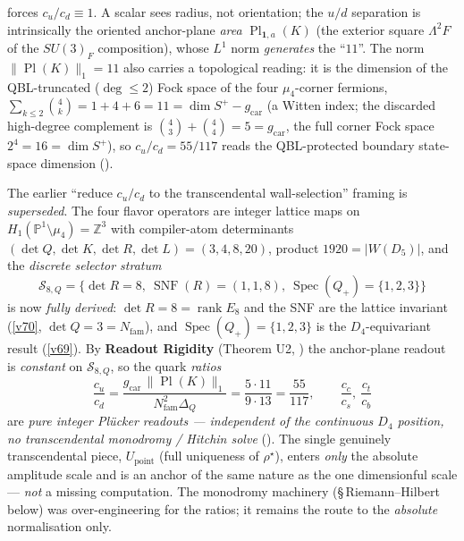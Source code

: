 \documentclass[11pt,a4paper]{article}
\newcommand{\gcar}{g_{\mathrm{car}}}
\newcommand{\Nfam}{N_{\mathrm{fam}}}
\newcommand{\PP}{\mathbb{P}}
\newcommand{\Z}{\mathbb{Z}}
\theoremstyle{definition}
\begin{document}
\begin{keybox}
forces $c_u/c_d\equiv1$. A scalar sees radius, not orientation; the $u/d$ separation is intrinsically the
oriented anchor-plane \emph{area} $\operatorname{Pl}_{\mathbf1,a}(K)$ (the exterior square $\Lambda^2F$ of
the $SU(3)_F$ composition), whose $L^1$ norm \emph{generates} the ``$11$''. 
The norm $\|\operatorname{Pl}(K)\|_1=11$ also carries a topological reading: it is the dimension of the
QBL-truncated ($\deg\le2$) Fock space of the four $\mu_4$-corner fermions,
$\sum_{k\le2}\binom4k=1{+}4{+}6=11=\dim S^+-\gcar$ (a Witten index; the discarded high-degree complement is
$\binom43{+}\binom44=5=\gcar$, the full corner Fock space $2^4=16=\dim S^+$), so $c_u/c_d=55/117$ reads the
QBL-protected boundary state-space dimension ().
\end{keybox}

\begin{keybox}
The earlier ``reduce $c_u/c_d$ to the transcendental wall-selection'' framing is \emph{superseded}. The four
flavor operators are integer lattice maps on $H_1(\PP^1\!\setminus\!\mu_4)=\Z^3$ with compiler-atom
determinants $(\det Q,\det K,\det R,\det L)=(3,4,8,20)$, product $1920=|W(D_5)|$, and the \emph{discrete
selector stratum}
\[
  \mathcal S_{8,Q}=\{\det R=8,\ \operatorname{SNF}(R)=(1,1,8),\ \operatorname{Spec}(Q_+)=\{1,2,3\}\}
\]
is now \emph{fully derived}: $\det R=8=\operatorname{rank}E_8$ and the SNF are the lattice invariant (\vref{v70},
$\det Q=3=\Nfam$), and $\operatorname{Spec}(Q_+)=\{1,2,3\}$ is the $D_4$-equivariant result (\vref{v69}). By
\textbf{Readout Rigidity} (Theorem U2, ) the anchor-plane readout is
\emph{constant} on $\mathcal S_{8,Q}$, so the quark \emph{ratios}
\[
  \frac{c_u}{c_d}=\frac{\gcar\,\|\operatorname{Pl}(K)\|_1}{\Nfam^2\Delta_Q}=\frac{5\cdot11}{9\cdot13}=\frac{55}{117},
  \qquad \frac{c_c}{c_s},\ \frac{c_t}{c_b}
\]
are \emph{pure integer Pl\"ucker readouts --- independent of the continuous $D_4$ position, no transcendental
monodromy / Hitchin solve} (). The single genuinely transcendental piece,
$U_{\mathrm{point}}$ (full uniqueness of $\rho^\star$), enters \emph{only} the absolute amplitude scale and is
an anchor of the same nature as the one dimensionful scale --- \emph{not} a missing computation. The monodromy
machinery (\S\,Riemann--Hilbert below) was over-engineering for the ratios; it remains the route to the
\emph{absolute} normalisation only.
\end{keybox}
\end{document}
